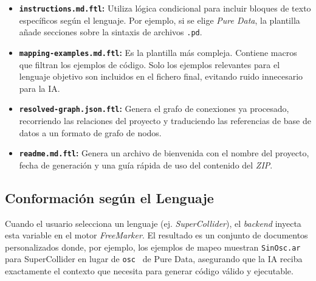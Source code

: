\begin{itemize}
    \item \textbf{\texttt{instructions.md.ftl}:} Utiliza lógica condicional para incluir bloques de texto específicos según el lenguaje. Por ejemplo, si se elige \textit{Pure Data}, la plantilla añade secciones sobre la sintaxis de archivos \texttt{.pd}.
    \item \textbf{\texttt{mapping-examples.md.ftl}:} Es la plantilla más compleja. Contiene macros que filtran los ejemplos de código. Solo los ejemplos relevantes para el lenguaje objetivo son incluidos en el fichero final, evitando ruido innecesario para la IA.
    \item \textbf{\texttt{resolved-graph.json.ftl}:} Genera el grafo de conexiones ya procesado, recorriendo las relaciones del proyecto y traduciendo las referencias de base de datos a un formato de grafo de nodos.
    \item \textbf{\texttt{readme.md.ftl}:} Genera un archivo de bienvenida con el nombre del proyecto, fecha de generación y una guía rápida de uso del contenido del \textit{ZIP}.
\end{itemize}

\subsection{Conformación según el Lenguaje}

Cuando el usuario selecciona un lenguaje (ej. \textit{SuperCollider}), el \textit{backend} inyecta esta variable en el motor \textit{FreeMarker}. El resultado es un conjunto de documentos personalizados donde, por ejemplo, los ejemplos de mapeo muestran \texttt{SinOsc.ar} para SuperCollider en lugar de \texttt{osc~} de Pure Data, asegurando que la IA reciba exactamente el contexto que necesita para generar código válido y ejecutable.


